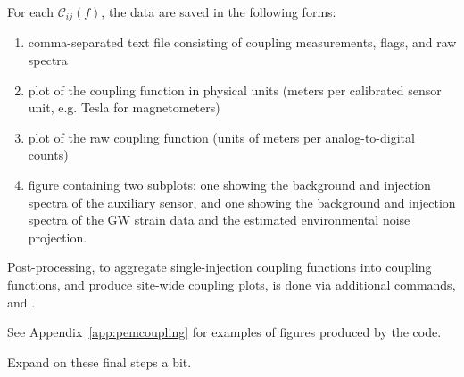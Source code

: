 For each $\mathcal{C}_{ij}(f)$, the data are saved in the following forms:
\begin{enumerate}
	\item comma-separated text file consisting of coupling measurements, flags, and raw spectra
	\item plot of the coupling function in physical units (meters per calibrated sensor unit, e.g. Tesla for magnetometers)
	\item plot of the  raw coupling function (units of meters per analog-to-digital counts)
	\item figure containing two subplots: one showing the background and injection spectra of the auxiliary sensor, and one showing the background and injection spectra of the \ac{GW} strain data and the estimated environmental noise projection.
\end{enumerate}

Post-processing, to aggregate single-injection coupling functions into coupling functions, and produce site-wide coupling plots, is done via additional commands,  and .

See Appendix~\ref{app:pemcoupling} for examples of figures produced by the \pemcoupling code.

{\color{red}
Expand on these final steps a bit.}
